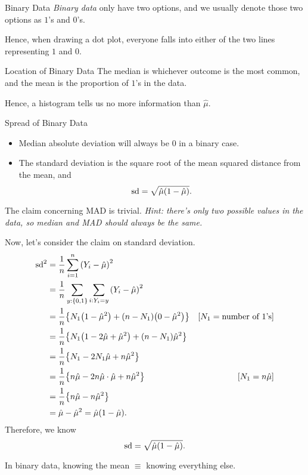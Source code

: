 \begin{df}{Binary Data}
	\textit{Binary data} only have two options, and we usually denote those two options as $1$'s and $0$'s. 	
\end{df}
\begin{cor}{}
	Hence, when drawing a dot plot, everyone falls into either of the two lines representing $1$ and $0$.
\end{cor}
\begin{thm}{Location of Binary Data}
	The median is whichever outcome is the most common, and the mean is the proportion of $1$'s in the data. 
\end{thm}
\begin{rmk}
	Hence, a histogram tells us no more information than $\hat\mu$.	
\end{rmk}
\begin{thm}{Spread of Binary Data}
	\begin{itemize}
		\item Median absolute deviation will always be $0$ in a binary case.
		\item The standard deviation is the square root of the mean squared distance from the mean, and \[\text{sd}=\sqrt{\hat\mu\qty(1-\hat\mu)}.\]
	\end{itemize}
\end{thm}
\begin{prf}
	The claim concerning MAD is trivial. \textit{Hint: there's only two possible values in the data, so median and MAD should always be the same.}\par Now, let's consider the claim on standard deviation. \begin{align*}\text{sd}^2&=\dfrac{1}{n}\sum_{i=1}^n\qty(Y_i-\hat\mu)^2\\&=\dfrac{1}{n}\sum_{y:\qty{0,1}}\sum_{i:Y_i=y}\qty(Y_i-\hat\mu)^2\\&=\dfrac{1}{n}\qty{N_1\qty(1-\hat\mu^2)+\qty(n-N_1)\qty(0-\hat\mu^2)}&[N_1=\text{number of }1\text{'s}]\\&=\dfrac{1}{n}\qty{N_1\qty(1-2\hat\mu+\hat\mu^2)+\qty(n-N_1)\hat\mu^2}\\&=\dfrac{1}{n}\qty{N_1-2N_1\hat\mu+n\hat\mu^2}\\&=\dfrac{1}{n}\qty{n\hat\mu-2n\hat\mu\cdot\hat\mu+n\hat\mu^2}&[N_1=n\hat\mu]\\&=\dfrac{1}{n}\qty{n\hat\mu-n\hat\mu^2}\\&=\hat\mu-\hat\mu^2=\hat\mu\qty(1-\hat\mu).\end{align*} Therefore, we know \[\text{sd}=\sqrt{\hat\mu\qty(1-\hat\mu)}.\]
\end{prf}
\begin{rmk}
	In binary data, knowing the mean $\equiv$ knowing everything else. 
\end{rmk}



